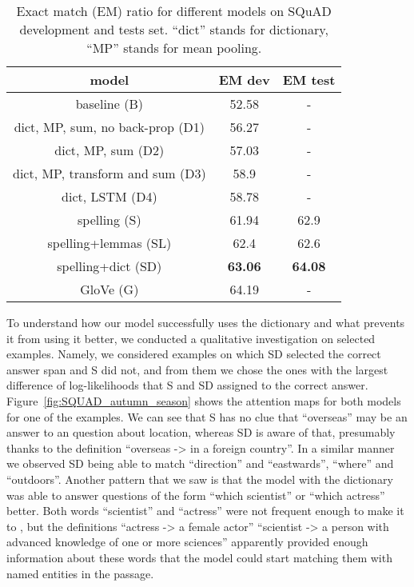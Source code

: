 \begin{table}
   \caption{\label{table:squad}Exact match (EM) ratio for different models on SQuAD development and tests set. ``dict'' stands for dictionary, ``MP'' stands for mean pooling.} 
  \centering
  \begin{tabular}{ccc}
  	\toprule
    model & EM dev & EM test \\
    \midrule
baseline (B) & 52.58 & - \\
    \midrule
    dict, MP, sum, no back-prop (D1) & 56.27 & - \\
    dict, MP, sum (D2) & 57.03 & - \\    
    dict, MP, transform and sum (D3) & 58.9 & - \\
    dict, LSTM (D4) & 58.78 & -  \\
    spelling (S) & 61.94 & 62.9 \\ 
spelling+lemmas (SL) & 62.4 & 62.6 \\
spelling+dict (SD) & \textbf{63.06} & \textbf{64.08} \\ 
\hline
    GloVe (G) & 64.19 & -\\ 
    \bottomrule
  \end{tabular}
\end{table}

To understand how our model successfully uses the dictionary and what prevents it from using it better, we conducted a qualitative investigation on selected examples. Namely, we considered examples on which SD selected the correct answer span and S did not, and from them we chose the ones with the largest difference of log-likelihoods that S and SD assigned to the correct answer. Figure~\ref{fig:SQUAD_autumn_season} shows the attention maps  for both models for one of the examples. We can see that S has no clue that ``overseas'' may be an answer to an question about location, whereas SD is aware of that, presumably thanks to the definition ``overseas -> in a foreign country''. In a similar manner we observed SD being able to match ``direction'' and ``eastwards'', ``where'' and ``outdoors''. Another pattern that we saw is that the model with the dictionary was able to answer questions of the form ``which scientist'' or ``which actress'' better. Both words ``scientist'' and ``actress'' were not frequent enough to make it to , but the definitions ``actress -> a female actor'' ``scientist -> a person with advanced knowledge of one or more sciences'' apparently provided enough information about these words that the model could start matching them with named entities in the passage. 




